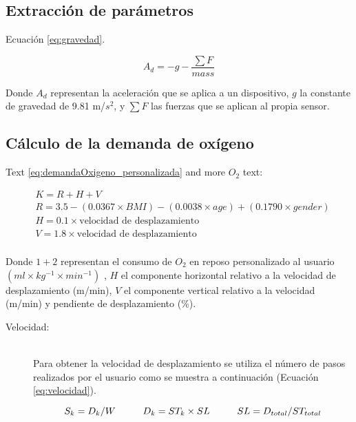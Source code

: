\subsection{Extracción de parámetros}
Ecuación \ref{eq:gravedad}. 

\begin{equation} \label{eq:gravedad}
A_{d} = -g - \frac{\sum F}{mass}
\end{equation} 


 


Donde $A_{d}$ representan la aceleración que se aplica a un dispositivo, $g$ la constante de gravedad de 9.81 m/$s^{2}$, y $\sum F$ las fuerzas que se aplican al propia sensor.

\subsection{Cálculo de la demanda de oxígeno} \label{secc:calculoDemandaOxigeno}
Text  \ref{eq:demandaOxigeno_personalizada} and more $O_{2}$ text:

\begin{equation} \label{eq:demandaOxigeno_personalizada}
\begin{split} 
& K = R + H + V \\ 
& R = 3.5 - (0.0367 \times BMI) - (0.0038 \times age) + (0.1790 \times gender)\\
& H = 0.1 \times \textrm{velocidad de desplazamiento}\\ 
& V = 1.8 \times \textrm{velocidad de desplazamiento}\\ 
\end{split} 
\end{equation} 

Donde $1 + 2$ representan el consumo de $O_{2}$ en reposo personalizado al usuario $(ml \times kg^{-1} \times min^{-1})$ \citep{Barstow:1991}, $H$ el componente horizontal relativo a la velocidad de desplazamiento (m/min), $V$ el componente vertical relativo a la velocidad (m/min) y pendiente de desplazamiento (\%).

\begin{description}
  \item[Velocidad:] \hfill \\
  	Para obtener la velocidad de desplazamiento se utiliza el número de pasos realizados por el usuario como se muestra a continuación (Ecuación \ref{eq:velocidad}).
  
\begin{equation} \label{eq:velocidad}
  S_{k} = D_{k}/W \hspace{10 mm} 
  D_{k} = ST_{k} \times SL \hspace{10 mm}
  SL = D_{total}/ST_{total} 
\end{equation}

\end{description}
	
\newpage

